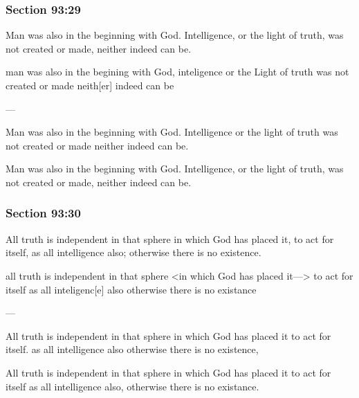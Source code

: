 	\subsubsection{Section 93:29} %
		\label{DC93-29}

		Man was also in the beginning with God. Intelligence, or the light of truth, was not created or made, neither indeed can be.

		\begin{framed}
		\scriptsize
			\begin{compactdesc}
				\item[JSP] man was also in the begining with God, inteligence or the Light of truth was not created or made neith[er] indeed can be
				\item[BC] ---
				\item[RB2] Man was also in the beginning with God. Intelligence or the light of truth was not created or made neither indeed can be. 
				\item[RB1] Man was also in the beginning with God. Intelligence, or the light of truth, was not created or made, neither indeed can be. 
			\end{compactdesc}
		\end{framed}

	\subsubsection{Section 93:30} %
		\label{DC93-30}

		All truth is independent in that sphere in which God has placed it, to act for itself, as all intelligence also; otherwise there is no existence.

		\begin{framed}
		\scriptsize
			\begin{compactdesc}
				\item[JSP] all truth is independent in that sphere <in which God has placed it---> to act for itself as all inteligenc[e] also otherwise there is no existance
				\item[BC] ---
				\item[RB2] All truth is independent in that sphere in which God has placed it to act for itself. as all intelligence also otherwise there is no existence, 
				\item[RB1] All truth is independent in that sphere in which God has placed it to act for itself as all intelligence also, otherwise there is no existance.
			\end{compactdesc}
		\end{framed}

